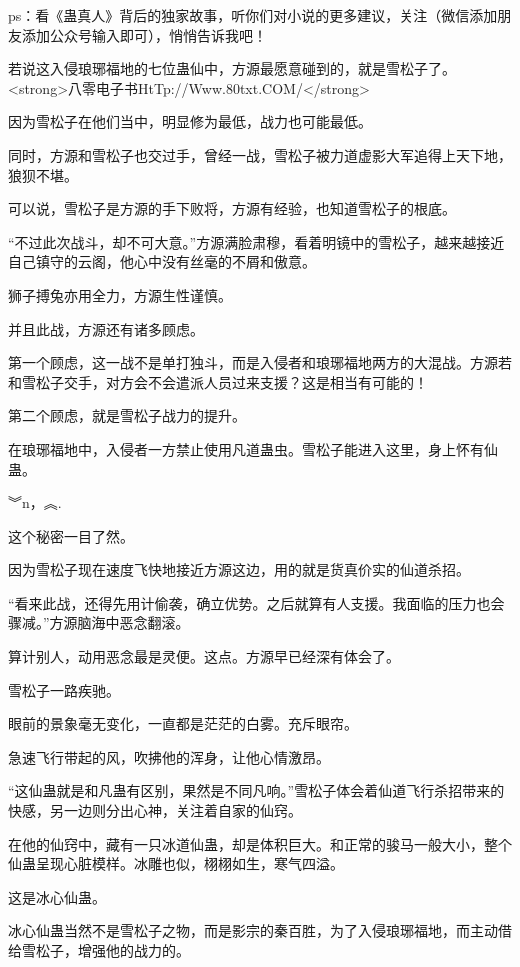 
\begin{this_body}

ps：看《蛊真人》背后的独家故事，听你们对小说的更多建议，关注（微信添加朋友添加公众号输入即可），悄悄告诉我吧！

若说这入侵琅琊福地的七位蛊仙中，方源最愿意碰到的，就是雪松子了。<strong>八零电子书HtTp://Www.80txt.COM/</strong>

因为雪松子在他们当中，明显修为最低，战力也可能最低。

同时，方源和雪松子也交过手，曾经一战，雪松子被力道虚影大军追得上天下地，狼狈不堪。

可以说，雪松子是方源的手下败将，方源有经验，也知道雪松子的根底。

“不过此次战斗，却不可大意。”方源满脸肃穆，看着明镜中的雪松子，越来越接近自己镇守的云阁，他心中没有丝毫的不屑和傲意。

狮子搏兔亦用全力，方源生性谨慎。

并且此战，方源还有诸多顾虑。

第一个顾虑，这一战不是单打独斗，而是入侵者和琅琊福地两方的大混战。方源若和雪松子交手，对方会不会遣派人员过来支援？这是相当有可能的！

第二个顾虑，就是雪松子战力的提升。

在琅琊福地中，入侵者一方禁止使用凡道蛊虫。雪松子能进入这里，身上怀有仙蛊。

︾n，︽.

这个秘密一目了然。

因为雪松子现在速度飞快地接近方源这边，用的就是货真价实的仙道杀招。

“看来此战，还得先用计偷袭，确立优势。之后就算有人支援。我面临的压力也会骤减。”方源脑海中恶念翻滚。

算计别人，动用恶念最是灵便。这点。方源早已经深有体会了。

雪松子一路疾驰。

眼前的景象毫无变化，一直都是茫茫的白雾。充斥眼帘。

急速飞行带起的风，吹拂他的浑身，让他心情激昂。

“这仙蛊就是和凡蛊有区别，果然是不同凡响。”雪松子体会着仙道飞行杀招带来的快感，另一边则分出心神，关注着自家的仙窍。

在他的仙窍中，藏有一只冰道仙蛊，却是体积巨大。和正常的骏马一般大小，整个仙蛊呈现心脏模样。冰雕也似，栩栩如生，寒气四溢。

这是冰心仙蛊。

冰心仙蛊当然不是雪松子之物，而是影宗的秦百胜，为了入侵琅琊福地，而主动借给雪松子，增强他的战力的。


\end{this_body}
